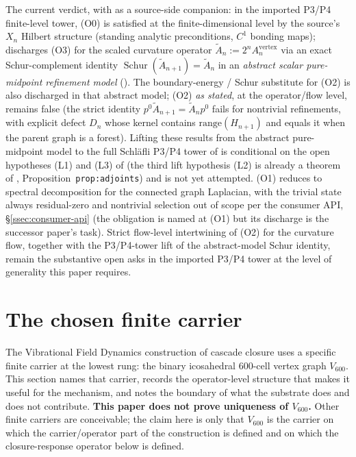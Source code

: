 \documentclass[11pt]{article}
\theoremstyle{definition}
\newcommand{\Vsub}{V_{600}}
\newcommand{\Schur}{\operatorname{Schur}}
\begin{document}
\noindent The current verdict, with
\cite{CascadeRefinementCompat} as a source-side companion: in the
imported P3/P4 finite-level tower, (O0) is satisfied at the
finite-dimensional level by the source's $X_n$ Hilbert structure
(standing analytic preconditions, $C^1$ bonding maps);
\cite{CascadeRefinementCompat} discharges (O3) for the scaled
curvature operator $\widetilde A_n := 2^n A_n^{\mathrm{vertex}}$
via an exact Schur-complement identity
$\Schur(\widetilde A_{n+1}) = \widetilde A_n$ in an
\emph{abstract scalar pure-midpoint refinement model}
(\cite[\S\texttt{sec:scope-and-gap}]{CascadeRefinementCompat}). The boundary-energy /
Schur substitute for (O2) is also discharged in that abstract
model; (O2) \emph{as stated}, at the operator/flow level, remains
false (the strict identity
$p^{0} \widetilde A_{n+1} = \widetilde A_n p^{0}$ fails for
nontrivial refinements, with explicit defect $D_n$ whose kernel
contains $\mathrm{range}(H_{n+1})$ and equals it when the parent
graph is a forest). Lifting these results from the abstract
pure-midpoint model to the full Schl\"{a}fli P3/P4 tower of
\cite{CascadeRefinementSpaces, CascadeClosureDynamics} is
conditional on the open hypotheses \textup{(L1)} and
\textup{(L3)} of \cite[\S\texttt{sec:scope-and-gap}]{CascadeRefinementCompat} (the third
lift hypothesis \textup{(L2)} is already a theorem of
\cite{CascadeRefinementSpaces}, Proposition~\texttt{prop:adjoints})
and is not yet attempted. (O1)
reduces to spectral decomposition for the connected graph
Laplacian, with the trivial state always residual-zero and
nontrivial selection out of scope per the consumer API,
\S\ref{ssec:consumer-api} (the obligation is named at (O1) but its
discharge is the successor paper's task). Strict flow-level
intertwining of (O2) for the curvature flow, together with the
P3/P4-tower lift of the abstract-model Schur identity, remain the
substantive open asks in the imported P3/P4 tower at the level of
generality this paper requires.

\section{The chosen finite carrier}\label{sec:carrier}

The Vibrational Field Dynamics construction of cascade closure uses
a specific finite carrier at the lowest rung: the binary icosahedral
600-cell vertex graph $\Vsub$. This section names that carrier,
records the operator-level structure that makes it useful for the
mechanism, and notes the boundary of what the substrate does and does
not contribute. \textbf{This paper does not prove uniqueness of $\Vsub$.}
Other finite carriers are conceivable; the claim here is only that
$\Vsub$ is the carrier on which the carrier/operator part of the construction is defined
and on which the closure-response operator below is defined.
\end{document}
